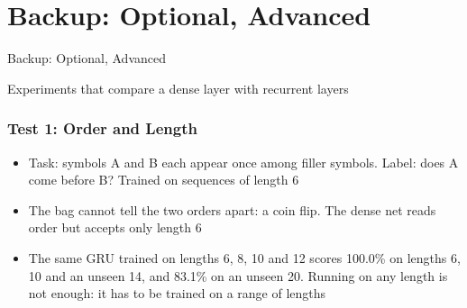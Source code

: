 
\section[Backup]{Backup: Optional, Advanced}

\begin{frame}
  \begin{center}
    {\Large Backup: Optional, Advanced}

    {\small Experiments that compare a dense layer with recurrent layers}
  \end{center}
\end{frame}

\begin{frame}[fragile] \frametitle{Test 1: Order and Length}
\begin{itemize}
\item Task: symbols A and B each appear once among filler symbols. Label: does A come before B? Trained on sequences of length 6
\end{itemize}
\begin{center}
\small
{}
\end{center}
\begin{itemize}
\item The bag cannot tell the two orders apart: a coin flip. The dense net reads order but accepts only length 6
\item The same GRU trained on lengths 6, 8, 10 and 12 scores 100.0\% on lengths 6, 10 and an unseen 14, and 83.1\% on an unseen 20. Running on any length is not enough: it has to be trained on a range of lengths
\end{itemize}
\end{frame}

